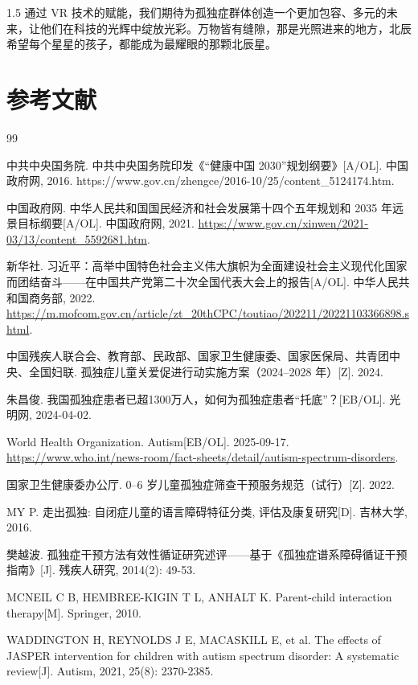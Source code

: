 \documentclass[zihao=-4]{ctexart}
\begin{document}
\begin{spacing}{1.5}
通过 VR 技术的赋能，我们期待为孤独症群体创造一个更加包容、多元的未来，让他们在科技的光辉中绽放光彩。万物皆有缝隙，那是光照进来的地方，北辰希望每个星星的孩子，都能成为最耀眼的那颗北辰星。

\newpage
\section*{参考文献}

\begin{thebibliography}{99}

 中共中央国务院. 中共中央国务院印发《“健康中国 2030”规划纲要》[A/OL]. 中国政府网, 2016. https://www.gov.cn/zhengce/2016-10/25/content\_5124174.htm.

 中国政府网. 中华人民共和国国民经济和社会发展第十四个五年规划和 2035 年远景目标纲要[A/OL]. 中国政府网, 2021. \url{https://www.gov.cn/xinwen/2021-03/13/content_5592681.htm}.

 新华社. 习近平：高举中国特色社会主义伟大旗帜为全面建设社会主义现代化国家而团结奋斗——在中国共产党第二十次全国代表大会上的报告[A/OL]. 中华人民共和国商务部, 2022. \url{https://m.mofcom.gov.cn/article/zt_20thCPC/toutiao/202211/20221103366898.shtml}.

 中国残疾人联合会、教育部、民政部、国家卫生健康委、国家医保局、共青团中央、全国妇联. 孤独症儿童关爱促进行动实施方案（2024--2028 年）[Z]. 2024.

 朱昌俊. 我国孤独症患者已超1300万人，如何为孤独症患者“托底”？[EB/OL]. 光明网, 2024-04-02.

 World Health Organization. Autism[EB/OL]. 2025-09-17. \url{https://www.who.int/news-room/fact-sheets/detail/autism-spectrum-disorders}.

 国家卫生健康委办公厅. 0--6 岁儿童孤独症筛查干预服务规范（试行）[Z]. 2022.

 MY P. 走出孤独: 自闭症儿童的语言障碍特征分类, 评估及康复研究[D]. 吉林大学, 2016.

 樊越波. 孤独症干预方法有效性循证研究述评——基于《孤独症谱系障碍循证干预指南》[J]. 残疾人研究, 2014(2): 49-53.

 MCNEIL C B, HEMBREE-KIGIN T L, ANHALT K. Parent-child interaction therapy[M]. Springer, 2010.

 WADDINGTON H, REYNOLDS J E, MACASKILL E, et al. The effects of JASPER intervention for children with autism spectrum disorder: A systematic review[J]. Autism, 2021, 25(8): 2370-2385.


\end{thebibliography}
\end{spacing}
\end{document}

